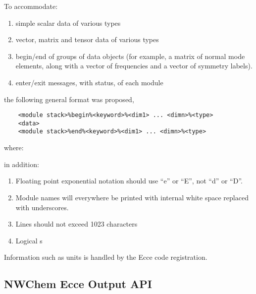 To accommodate:
\begin{enumerate}
\item simple scalar data of various types
\item vector, matrix and tensor data of various types
\item begin/end of groups of data objects (for example, a matrix of
  normal mode elements, along with a vector of frequencies and a
  vector of symmetry labels).
\item enter/exit messages, with status, of each module
\end{enumerate}
the following general format was proposed,
\begin{verbatim}
    <module stack>%begin%<keyword>%<dim1> ... <dimn>%<type>
    <data>
    <module stack>%end%<keyword>%<dim1> ... <dimn>%<type>
\end{verbatim}
where:
in addition:
\begin{enumerate}
\item Floating point exponential  notation should  use ``e'' or ``E'', 
  not ``d'' or ``D''.
\item Module names will everywhere be printed with internal white space
  replaced with underscores.
\item Lines should not exceed 1023 characters
\item Logical s
\end{enumerate}

Information such as units is handled by the Ecce code registration.

\subsection{NWChem Ecce Output API}

